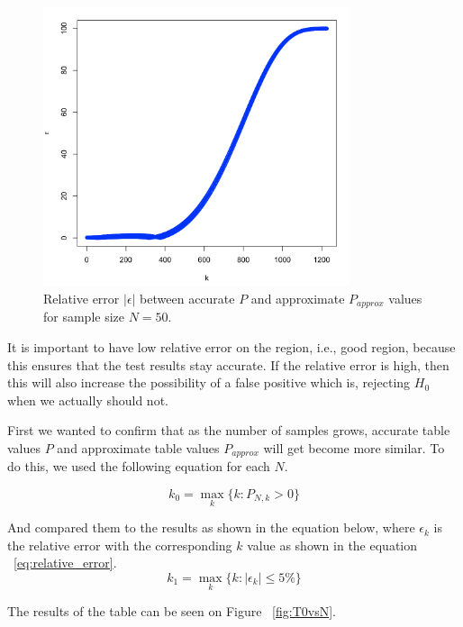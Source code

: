 \documentclass[12pt]{article}
\begin{document}
{\begin{figure}[H]
  \centering
  \includegraphics[width=0.8\textwidth]{approximate_accurate_epsilon}
  \caption{Relative error $|\epsilon|$ between accurate $P$ and approximate $P_{approx}$ values for sample size $N=50$.}
  \label{fig:epsilon_difference}
\end{figure}

It is important to have low relative error on the region, i.e., good region, because this ensures that the test results stay accurate. If the relative error is high, then this will also increase the possibility of a false positive which is, rejecting $H_0$ when we actually should not.

First we wanted to confirm that as the number of samples grows, accurate table values $P$ and approximate table values $P_{approx}$ will get become more similar. To do this, we used the following equation for each $N$.

\begin{equation}
  k_0 = \max_k \{ k: P_{N, k} > 0 \}
\end{equation}

And compared them to the results as shown in the equation below, where $\epsilon_k$ is the relative error with the corresponding $k$ value as shown in the equation ~\eqref{eq:relative_error}.
\begin{equation}
  k_1 = \max_k \{ k: |\epsilon_k| \leq 5\% \}
\end{equation}

The results of the table can be seen on Figure ~\ref{fig:T0vsN}.

}
\end{document}
